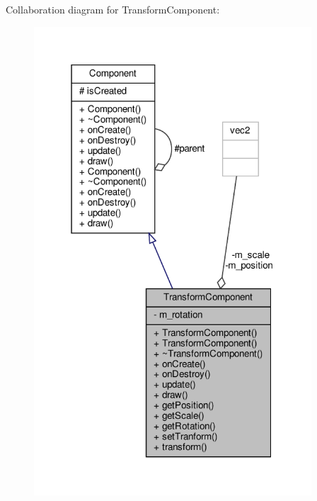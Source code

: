 Collaboration diagram for Transform\+Component\+:
\nopagebreak
\begin{figure}[H]
\begin{center}
\leavevmode
\includegraphics[width=294pt]{classTransformComponent__coll__graph}
\end{center}
\end{figure}
